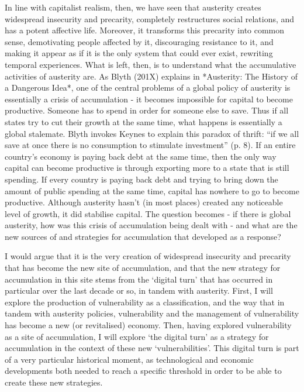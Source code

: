 In line with capitalist realism, then, we have seen that austerity
creates widespread insecurity and precarity, completely restructures
social relations, and has a potent affective life. Moreover, it
transforms this precarity into common sense, demotivating people
affected by it, discouraging resistance to it, and making it appear as
if it is the only system that could ever exist, rewriting temporal
experiences. What is left, then, is to understand what the accumulative
activities of austerity are. As Blyth (201X) explains in *Austerity: The
History of a Dangerous Idea*, one of the central problems of a global
policy of austerity is essentially a crisis of accumulation - it becomes
impossible for capital to become productive. Someone has to spend in
order for someone else to save. Thus if all states try to cut their
growth at the same time, what happens is essentially a global stalemate.
Blyth invokes Keynes to explain this paradox of thrift: ``if we all save
at once there is no consumption to stimulate investment'' (p. 8). If an
entire country's economy is paying back debt at the same time, then the
only way capital can become productive is through exporting more to a
state that is still spending. If every country is paying back debt and
trying to bring down the amount of public spending at the same time,
capital has nowhere to go to become productive. Although austerity
hasn't (in most places) created any noticeable level of growth, it did
stabilise capital. The question becomes - if there is global austerity,
how was this crisis of accumulation being dealt with - and what are the
new sources of and strategies for accumulation that developed as a
response?

I would argue that it is the very creation of widespread insecurity and
precarity that has become the new site of accumulation, and that the new
strategy for accumulation in this site stems from the `digital turn'
that has occurred in particular over the last decade or so, in tandem
with austerity. First, I will explore the production of vulnerability as
a classification, and the way that in tandem with austerity policies,
vulnerability and the management of vulnerability has become a new (or
revitalised) economy. Then, having explored vulnerability as a site of
accumulation, I will explore `the digital turn' as a strategy for
accumulation in the context of these new `vulnerabilities'. This digital
turn is part of a very particular historical moment, as technological
and economic developments both needed to reach a specific threshold in
order to be able to create these new strategies.

